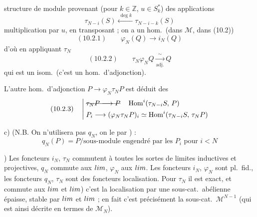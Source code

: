 \documentclass[11pt,a4paper]{article}
\begin{document}
 structure de module provenant (pour $k\in\mathbb{Z}$, $u\in S^*_k$) des applications
\[
\tau_{N-i}(S) \xleftarrow{\ \deg k\ } \tau_{N-i-k}(S)
\]
multiplication par $u$, en transposant ; on a un hom.\ (dans \struck{\ill{}} $\mathcal{M}$,  dans (10.2))
\[
(10.2.1)\qquad \varphi_N(Q) \longrightarrow i_N(Q)
\]
d'où en appliquant $\tau_N$
\[
(10.2.2)\qquad \tau_N\varphi_N Q \xrightarrow[\text{adj.}]{\ \sim\ } Q
\]
qui est un isom.\ (c'est un hom.\ d'adjonction).

L'autre hom.\ d'adjonction
 $P \longrightarrow \varphi_N\tau_N P$
est déduit des \struck{\ill{}}
\[
(10.2.3)\quad
\left|\;\begin{aligned}
&\text{\struck{$\tau_N P \longrightarrow P$}} \quad \operatorname{Hom}^i(\tau_{N-i}S,\, P)\\
&P_i \longrightarrow (\varphi_N\tau_N P)_i \simeq \operatorname{Hom}^i(\tau_{N-i}S,\, \tau_N P)
\end{aligned}\right.
\]

c) (N.B. On n'utilisera pas $q_N$, on le  par ) :
\[
q_N(P) = P/\text{sous-module engendré par les } P_i \text{ pour } i<N
\]

) Les foncteurs $i_N$, $\tau_N$ commutent à toutes les sortes de limites inductives et projectives, $q_N$ commute aux $\varinjlim$, $\varphi_N$ aux $\varprojlim$. Les foncteurs $i_N$, $\varphi_N$ sont pl.\ fid., les foncteurs $q_N$, $\tau_N$ sont des foncteurs localisation. \struck{\ill{}} Pour $\tau_N$  il est exact, et commute aux $\varinjlim$ et $\varprojlim$) c'est la localisation par une sous-cat.\ abélienne épaisse, stable par $\varinjlim$ et $\varprojlim$ ; en fait c'est précisément la sous-cat.\ $\mathcal{M}^{N-1}$ (qui est ainsi décrite \struck{\ill{}} en termes de $\mathcal{M}_N$).
\end{document}

